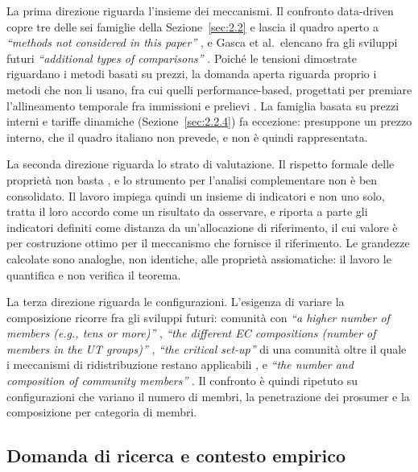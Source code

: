 La prima direzione riguarda l'insieme dei meccanismi. Il confronto data-driven copre tre delle sei famiglie della Sezione~\ref{sec:2.2} e lascia il quadro aperto a \textit{``methods not considered in this paper''} \cite{gonzalezAsenjo2026}, e Gasca et al.\ elencano fra gli sviluppi futuri \textit{``additional types of comparisons''} \cite{gasca2024}. Poiché le tensioni dimostrate riguardano i metodi basati su prezzi, la domanda aperta riguarda proprio i metodi che non li usano, fra cui quelli performance-based, progettati per premiare l'allineamento temporale fra immissioni e prelievi \cite{gianaroli2024, giudice2026}. La famiglia basata su prezzi interni e tariffe dinamiche (Sezione~\ref{sec:2.2.4}) fa eccezione: presuppone un prezzo interno, che il quadro italiano non prevede, e non è quindi rappresentata.

La seconda direzione riguarda lo strato di valutazione. Il rispetto formale delle proprietà non basta \cite{gonzalezAsenjo2026}, e lo strumento per l'analisi complementare non è ben consolidato. Il lavoro impiega quindi un insieme di indicatori e non uno solo, tratta il loro accordo come un risultato da osservare, e riporta a parte gli indicatori definiti come distanza da un'allocazione di riferimento, il cui valore è per costruzione ottimo per il meccanismo che fornisce il riferimento. Le grandezze calcolate sono analoghe, non identiche, alle proprietà assiomatiche: il lavoro le quantifica e non verifica il teorema.

La terza direzione riguarda le configurazioni. L'esigenza di variare la composizione ricorre fra gli sviluppi futuri: comunità con \textit{``a higher number of members (e.g., tens or more)''} \cite{volpato2024}, \textit{``the different EC compositions (number of members in the UT groups)''} \cite{minutoLanzini2022}, \textit{``the critical set-up''} di una comunità oltre il quale i meccanismi di ridistribuzione restano applicabili \cite{fina2024}, e \textit{``the number and composition of community members''} \cite{giudice2026}. Il confronto è quindi ripetuto su configurazioni che variano il numero di membri, la penetrazione dei prosumer e la composizione per categoria di membri.

\subsection*{Domanda di ricerca e contesto empirico}

